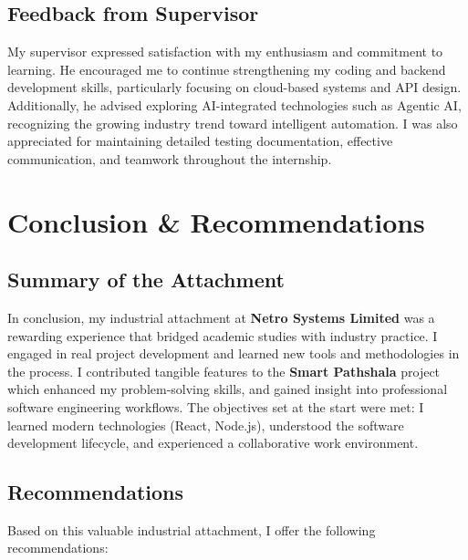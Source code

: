 \documentclass[12pt,a4paper]{report}
\newcommand{\company}[1]{\textcolor{companycolor}{\textbf{#1}}}
\newcommand{\project}[1]{\textcolor{projectcolor}{\textbf{#1}}}
\let\oldcite\cite
\renewcommand{\cite}[1]{\textcolor{impactcolor}{\oldcite{#1}}}
\begin{document}
\section{Feedback from Supervisor}
My supervisor expressed satisfaction with my enthusiasm and commitment to learning. He encouraged me to continue strengthening my coding and backend development skills, particularly focusing on cloud-based systems and API design. Additionally, he advised exploring AI-integrated technologies such as Agentic AI, recognizing the growing industry trend toward intelligent automation. I was also appreciated for maintaining detailed testing documentation, effective communication, and teamwork throughout the internship.


\chapter{Conclusion \& Recommendations}
\section{Summary of the Attachment}
In conclusion, my industrial attachment at \company{Netro Systems Limited} was a rewarding experience that bridged academic studies with industry practice. I engaged in real project development and learned new tools and methodologies in the process. I contributed tangible features to the \project{Smart Pathshala} project which enhanced my problem-solving skills, and gained insight into professional software engineering \cite{ref11} workflows. The objectives set at the start were met: I learned modern technologies (React, Node.js), understood the software development lifecycle, and experienced a collaborative work environment.

\section{Recommendations}
Based on this valuable industrial attachment, I offer the following recommendations:
\end{document}
